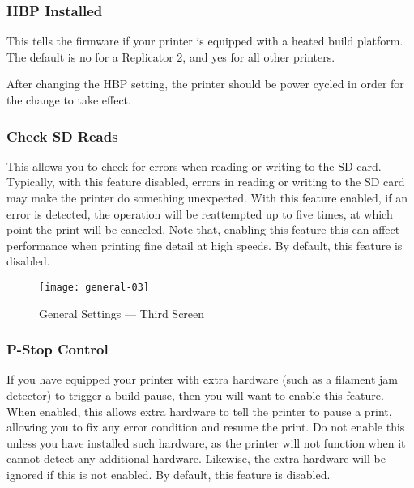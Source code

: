 
\subsubsection{HBP Installed} \label{sec:hbp-present}

This tells the firmware if your printer is equipped with a heated build platform.  The default is no for a Replicator 2, and yes for all other printers.

After changing the \gls{HBP} setting, the printer should be power cycled in order for the change to take effect.


\subsubsection{Check SD Reads} \label{sec:sd-crc}

This allows you to check for errors when reading or writing to the SD card.  Typically, with this feature disabled, errors in reading or writing to the SD card may make the printer do something unexpected.  With this feature enabled, if an error is detected, the operation will be reattempted up to five times, at which point the print will be canceled.  Note that, enabling this feature this can affect performance when printing fine detail at high speeds.  By default, this feature is disabled.
 
 \begin{figure}[!htbp]
  \centering
    \texttt{[image: general-03]}
    \caption{General Settings --- Third Screen}
  \label{fig:gen3}
\end{figure}


\subsubsection{P-Stop Control} \label{sec:pstop-enable}

If you have equipped your printer with extra hardware (such as a filament jam detector) to trigger a build pause, then you will want to enable this feature.  When enabled, this allows extra hardware to tell the printer to pause a print, allowing you to fix any error condition and resume the print.  Do not enable this unless you have installed such hardware, as the printer will not function when it cannot detect any additional hardware.  Likewise, the extra hardware will be ignored if this is not enabled.  By default, this feature is disabled.

